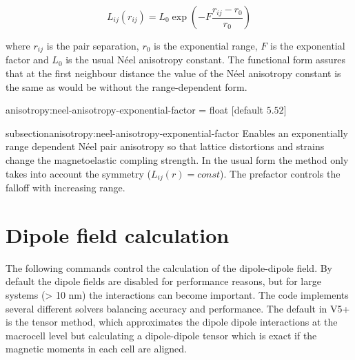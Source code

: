 \begin{equation}
   L_{ij}(r_{ij}) = L_0 \exp\left(-F\frac{r_{ij} - r_0}{r_{0}}\right)
\end{equation}

\noindent where $r_{ij}$ is the pair separation, $r_0$ is the exponential range,
$F$ is the exponential factor and $L_0$ is the usual N\'eel anisotropy constant.
The functional form assures that at the first neighbour distance the value of
the N\'eel anisotropy constant is the same as would be without the
range-dependent form.

{\zicf anisotropy:neel-anisotropy-exponential-factor = float [default $5.52$]}
{subsection}{anisotropy:neel-anisotropy-exponential-factor} Enables an
exponentially range dependent N\'eel pair anisotropy so that lattice distortions
and strains change the magnetoelastic compling strength. In the usual form the
method only takes into account the symmetry ($L_{ij}(r) = const$). The prefactor
controls the falloff with increasing range.

\section*{Dipole field calculation}
The following commands control the calculation of the dipole-dipole field. By
default the dipole fields are disabled for performance reasons, but for large
systems (> 10 nm) the interactions can become important. The \vampire code
implements several different solvers balancing accuracy and performance. The
default in V5+ is the tensor method, which approximates the dipole dipole
interactions at the macrocell level but calculating a dipole-dipole tensor which
is exact if the magnetic moments in each cell are aligned.

